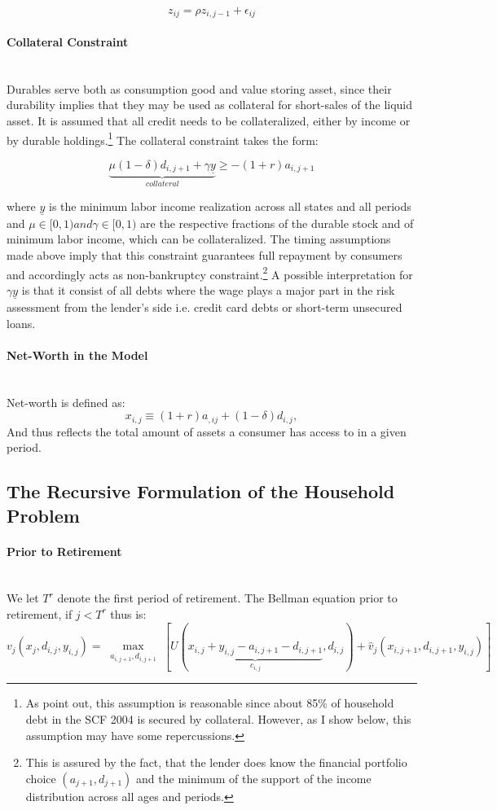 \documentclass[a4paper,12pt,legno]{article}
\newcommand{\myparagraph}[1]{\paragraph{#1}\mbox{}\\}
\begin{document}
\begin{equation}\label{eq:ar1_shock}
z_{ij} = \rho z_{i,j-1}+\epsilon_{ij}
\end{equation}


\myparagraph{Collateral Constraint}
Durables serve both as consumption good and value storing asset, since their durability implies that they may be used as collateral for short-sales of the liquid asset. It is assumed that all credit needs to be collateralized, either by income or by durable holdings.\footnote{As \cite{hintermaier2010} point out, this assumption is reasonable since about 85\% of household debt in the SCF 2004 is secured by collateral. However, as I show below, this assumption may have some repercussions.} The collateral constraint takes the form:

\begin{equation}\label{eq:borrowing_constraint}
\underbrace{\mu(1-\delta)d_{i,j+1} + \gamma\underline{y}}_{collateral} \geq -(1+r)a_{i,j+1}
\end{equation}

where $\underline{y}$ is the minimum labor income realization across all states and all periods and $\mu \in [0,1) and \gamma \in [0,1)$ are the respective fractions of the durable stock and of minimum labor income, which can be collateralized. The timing assumptions made above imply that this constraint guarantees full repayment by consumers and accordingly acts as non-bankruptcy constraint.\footnote{This is assured by the fact, that the lender does know the financial portfolio choice $(a_{j+1},d_{j+1})$ and the minimum of the support of the income distribution across all ages and periods.} A possible interpretation for $\gamma\underline{y}$ is that it consist of all debts where the wage plays a major part in the risk assessment from the lender's side i.e. credit card debts or short-term unsecured loans. 


\myparagraph{Net-Worth in the Model} 
Net-worth is defined as:
\begin{equation}\label{eq:net_worth}
x_{i,j} \equiv (1+r)a_{,ij} + (1-\delta)d_{i,j},
\end{equation}
And thus reflects the total amount of assets a consumer has access to in a given period.

\subsection{The Recursive Formulation of the Household Problem} 
\myparagraph{Prior to Retirement}
We let $T^{r}$ denote the first period of retirement.
The Bellman equation prior to retirement, if $j < T^{r}$ thus is:
\begin{equation}
v_{j}(x_{j},d_{i,j},y_{i,j}) = \max_{\substack{a_{i,j+1},d_{i,j+1}}}\left[U(\underbrace{x_{i,j}+y_{i,j}-a_{i,j+1}-d_{i,j+1}}_{c_{i,j}},d_{i,j})+\hat{v}_{j}(x_{i,j+1},d_{i,j+1},y_{i,j})\right]
\end{equation}
\end{document}
